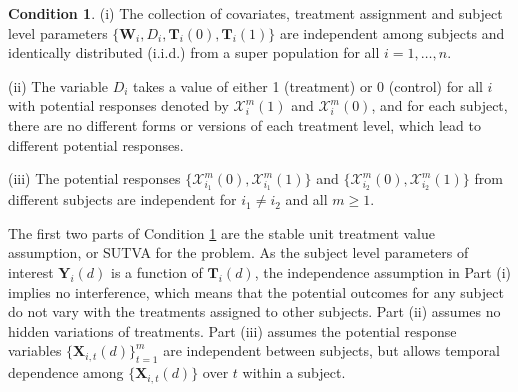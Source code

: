 \documentclass[12pt]{article}
\theoremstyle{definition}
\newtheorem{as}{Condition}
\newcommand{\bT}{{\mathbf T}}
\newcommand{\bW}{{\mathbf W}}
\newcommand{\bX}{{\mathbf X}}
\newcommand{\bY}{{\mathbf Y}}
\begin{document}
\begin{as}
(i) The collection of covariates, treatment assignment and 
subject level parameters
$\{\bW_{i}, D_{i}, \bT_{i}(0), \bT_{i}(1)\}$
are independent among subjects and identically distributed (i.i.d.) from a super population for all $i = 1, \ldots, n$. 

(ii) The variable $D_i$ takes a value of either 1 (treatment) or 0 (control) for all $i$ with potential responses denoted by $\mathcal{X}_{i}^m(1)$ and $\mathcal{X}_{i}^m(0)$, and for each subject, there are no different forms or versions of each treatment level, which lead to different potential responses.

(iii) The potential responses $\{\mathcal{X}_{i_1}^m(0), \mathcal{X}_{i_1}^m(1)\}$ and $\{\mathcal{X}_{i_2}^m(0), \mathcal{X}_{i_2}^m(1)\}$ from different subjects are independent for $i_1 \neq i_2$ and all $m \geq 1$. 
\label{as:iid}\end{as}

The first two parts of Condition \ref{as:iid} are the stable unit treatment value assumption, or SUTVA \citep{ImbensRubin2015} for the problem. As the subject level parameters of interest $\bY_{i}(d)$ is a function of $\bT_{i}(d)$, the independence assumption in Part (i) implies no interference, which means that the potential outcomes for any subject do not vary with the treatments assigned to other subjects. Part (ii) assumes no hidden variations of treatments. 
Part (iii) assumes the potential response variables $\{\bX_{i, t}(d)\}_{t=1}^{m}$ are independent between subjects, but allows temporal dependence among $\{\bX_{i, t}(d)\}$ over $t$ within a subject. 

\end{document}

